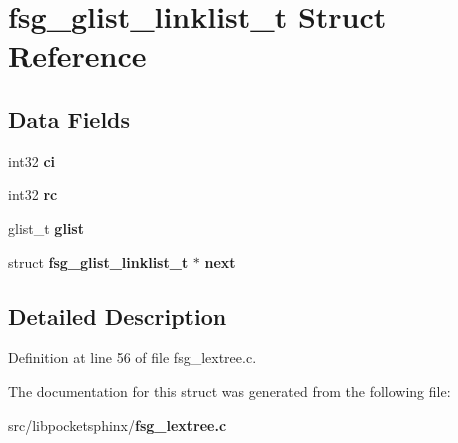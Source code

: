 \section{fsg\+\_\+glist\+\_\+linklist\+\_\+t Struct Reference}
\label{structfsg__glist__linklist__t}
\subsection*{Data Fields}
\begin{DoxyCompactItemize}
\item 
int32 {\bfseries ci}\label{structfsg__glist__linklist__t_aee967d5f9700245d9bf02f22d730fe86}

\item 
int32 {\bfseries rc}\label{structfsg__glist__linklist__t_ad5fd289a4223f35f2f87b974cbc6bd81}

\item 
glist\+\_\+t {\bfseries glist}\label{structfsg__glist__linklist__t_a2bc9d5102b5a082d3ece84ac4dca51be}

\item 
struct {\bf fsg\+\_\+glist\+\_\+linklist\+\_\+t} $\ast$ {\bfseries next}\label{structfsg__glist__linklist__t_ae6b27b46998d4c2ee400ef828c3cbe57}

\end{DoxyCompactItemize}


\subsection{Detailed Description}


Definition at line 56 of file fsg\+\_\+lextree.\+c.



The documentation for this struct was generated from the following file\+:\begin{DoxyCompactItemize}
\item 
src/libpocketsphinx/{\bf fsg\+\_\+lextree.\+c}\end{DoxyCompactItemize}
